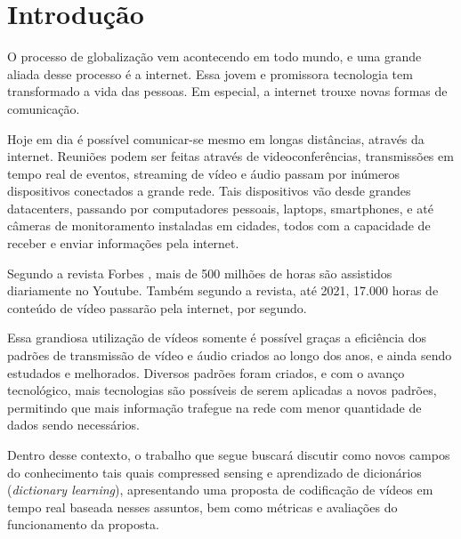 \documentclass[cic,tc]{iiufrgs}
\begin{document}

\tableofcontents


\chapter{Introdução}
O processo de globalização vem acontecendo em todo mundo, 
e uma grande aliada desse processo é a internet.
Essa jovem e promissora tecnologia tem transformado a vida das pessoas.
Em especial, a internet trouxe novas formas de comunicação.

Hoje em dia é possível comunicar-se mesmo em longas distâncias, 
através da internet.
Reuniões podem ser feitas através de videoconferências, transmissões 
em tempo real de eventos, streaming de vídeo e áudio passam por 
inúmeros dispositivos conectados a grande rede.
Tais dispositivos vão desde grandes datacenters, passando por computadores 
pessoais, laptops, smartphones, e até câmeras de monitoramento instaladas
em cidades, todos com a capacidade de receber e enviar informações 
pela internet.

Segundo a revista Forbes \cite{VideoMarketing}, mais de 500 milhões de horas são assistidos 
diariamente no Youtube. 
Também segundo a revista, até 2021, 17.000 horas de conteúdo de vídeo passarão 
pela internet, por segundo.

Essa grandiosa utilização de vídeos somente é possível graças a eficiência 
dos padrões de transmissão de vídeo e áudio criados ao longo dos anos, 
e ainda sendo estudados e melhorados.
Diversos padrões foram criados, e com o avanço tecnológico, mais tecnologias
são possíveis de serem aplicadas a novos padrões, permitindo que mais informação
trafegue na rede com menor quantidade de dados sendo necessários.

Dentro desse contexto, o trabalho que segue buscará discutir como novos 
campos do conhecimento tais quais compressed sensing e aprendizado de 
dicionários (\emph{dictionary learning}), apresentando uma proposta de 
codificação de vídeos em tempo real baseada nesses assuntos, bem como 
métricas e avaliações do funcionamento da proposta.
\end{document}
